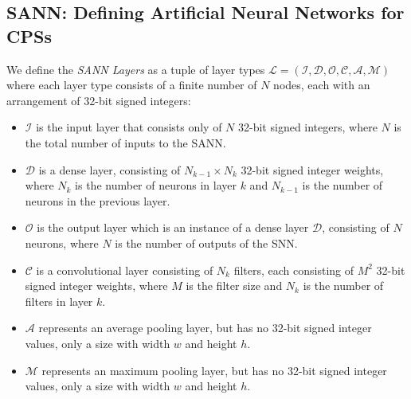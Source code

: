 \subsection{\ac{SANN}: Defining Artificial Neural Networks for \acp{CPS}}
\begin{definition}
	\label{def:layer}We define the \emph{\ac{SANN} Layers} as a tuple of layer types $\mathcal{L} = (\mathcal{I}, \mathcal{D}, \mathcal{O}, \mathcal{C}, \mathcal{A}, \mathcal{M})$ where each layer type consists of a finite number of $N$ nodes, each with an arrangement of 32-bit signed integers:
	\begin{itemize}
		\item $\mathcal{I}$ is the input layer that consists only of $N$ 32-bit signed integers, where $N$ is the total number of inputs to the \ac{SANN}.
		\item $\mathcal{D}$ is a dense layer, consisting of $N_{k-1} \times N_k$ 32-bit signed integer weights, where $N_k$ is the number of neurons in layer $k$ and $N_{k-1}$ is the number of neurons in the previous layer.
		\item $\mathcal{O}$ is the output layer which is an instance of a dense layer $\mathcal{D}$, consisting of $N$ neurons, where $N$ is the number of outputs of the \ac{SNN}.
		\item $\mathcal{C}$ is a convolutional layer consisting of $N_k$ filters, each consisting of $M^2$ 32-bit signed integer weights, where $M$ is the filter size and $N_k$ is the number of filters in layer $k$.
		\item $\mathcal{A}$ represents an average pooling layer, but has no 32-bit signed integer values, only a size with width $w$ and height $h$.
		\item $\mathcal{M}$ represents an maximum pooling layer, but has no 32-bit signed integer values, only a size with width $w$ and height $h$.
	\end{itemize}
\end{definition}

